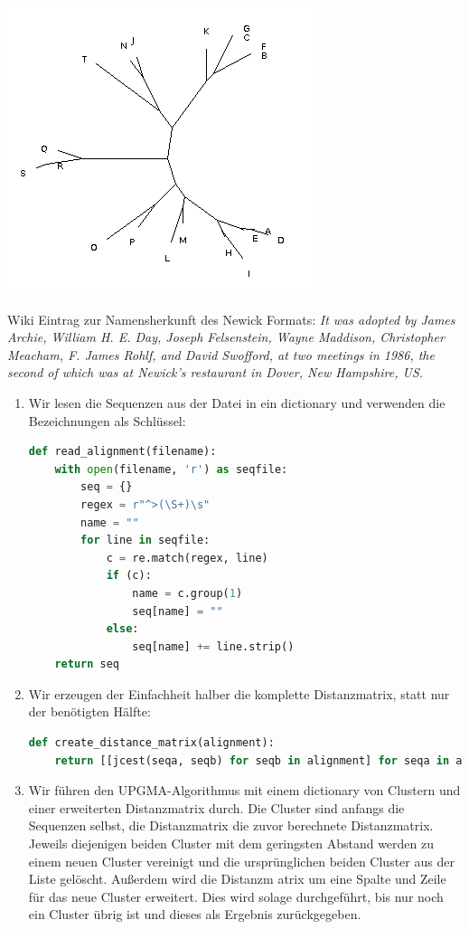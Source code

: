 \documentclass{homework}
\begin{document}
\begin{enumerate}
	\includegraphics[scale=0.4]{u3_aufg2_max_parsimony.png} 

Wiki Eintrag zur Namensherkunft des Newick Formats: \textit{It was adopted by James Archie, William H. E. Day, Joseph Felsenstein, Wayne Maddison, Christopher Meacham, F. James Rohlf, and David Swofford, at two meetings in 1986, the second of which was at Newick's restaurant in Dover, New Hampshire, US.}

\begin{enumerate}
\item Wir lesen die Sequenzen aus der Datei in ein dictionary und verwenden die
Bezeichnungen als Schlüssel:

\begin{lstlisting}[language=python]
def read_alignment(filename):
	with open(filename, 'r') as seqfile:
		seq = {}
		regex = r"^>(\S+)\s"
		name = ""
		for line in seqfile:
			c = re.match(regex, line)
			if (c):
				name = c.group(1)
				seq[name] = ""
			else:
				seq[name] += line.strip()
	return seq
\end{lstlisting}

\item Wir erzeugen der Einfachheit halber die komplette Distanzmatrix, statt nur
der benötigten Hälfte:

\begin{lstlisting}[language=python]
def create_distance_matrix(alignment):
	return [[jcest(seqa, seqb) for seqb in alignment] for seqa in alignment]
\end{lstlisting}

\item Wir führen den UPGMA-Algorithmus mit einem dictionary von Clustern und
einer erweiterten Distanzmatrix durch. Die Cluster sind anfangs die Sequenzen
selbst, die Distanzmatrix die zuvor berechnete Distanzmatrix. Jeweils diejenigen
beiden Cluster mit dem geringsten Abstand werden zu einem neuen Cluster
vereinigt und die ursprünglichen beiden Cluster aus der Liste gelöscht.
Außerdem wird die Distanzm	atrix um eine Spalte und Zeile für das neue Cluster
erweitert. Dies wird solage durchgeführt, bis nur noch ein Cluster übrig ist und
dieses als Ergebnis zurückgegeben.


\end{enumerate}
\end{enumerate}
\end{document}
